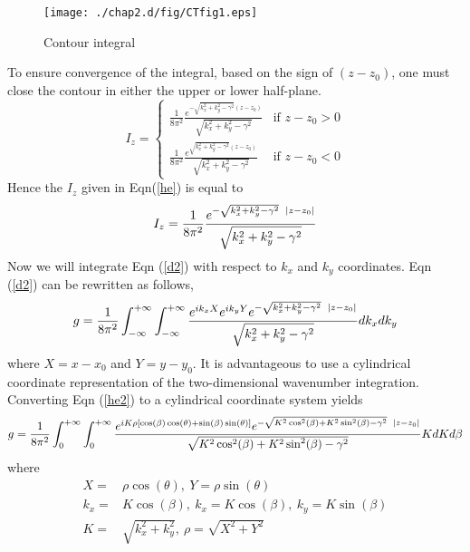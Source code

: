 \begin{figure}[h!]
\begin{center}
\texttt{[image: ./chap2.d/fig/CTfig1.eps]}
\caption{Contour integral}
\label{contour}
\end{center}
\end {figure}


To ensure convergence of the integral,  based on the  sign of $(z-z_0)$,
one must close the contour in either the upper or lower half-plane.
\begin{equation}
I_z = \begin{cases}
\frac{1}{8 \pi^2}\frac{e^{-\sqrt{k_x^2+k_y^2-\gamma^2}(z-z_0)}}{\sqrt {k_x^2+k_y^2-\gamma^2}}    &\mbox{if } z-z_0>0 \\ 
\frac{1}{8 \pi^2}\frac{e^{\sqrt{k_x^2+k_y^2-\gamma^2}(z-z_0)}}{\sqrt {k_x^2+k_y^2-\gamma^2}}    &\mbox{if } z-z_0 <0 
\end{cases}
\end{equation}
%
Hence the $I_z$ given in Eqn(\ref{he}) is equal to
\begin{equation}
I_z = 
\frac{1}{8 \pi^2}\frac{e^{-\sqrt{k_x^2+k_y^2-\gamma^2}\enskip |z-z_0|}}{\sqrt {k_x^2+k_y^2-\gamma^2}}
\end{equation}
%
Now we will integrate Eqn (\ref{d2}) with respect to $ k_x $ and $k_y$ coordinates.
Eqn (\ref{d2}) can be rewritten as follows,
%
\begin{equation}
\label{he2}
g=\frac{1}{8\pi^2}\int_{-\infty}^{+\infty}\int_{-\infty}^{+\infty}\frac{e^{ik_xX}e^{ik_yY} e^{-\sqrt{k_x^2+k_y^2-\gamma^2}\enskip|z-z_0|}}{\sqrt{k_x^2+k_y^2-\gamma^2} }dk_x dk_y   
\end{equation}
where $ X = x-x_0 $ and $ Y= y-y_0  $.
It is advantageous to use a cylindrical coordinate representation of the 
two-dimensional wavenumber integration. 
Converting Eqn (\ref{he2}) to a cylindrical coordinate system yields
\begin{equation}
  g=\frac{ 1}{8\pi^2}\int_{0}^{+\infty}\int_{0}^{+\infty}
  \frac{e^{iK \rho {[\cos(\beta)\cos(\theta)+\sin(\beta)\sin(\theta)}]}  
    e^{-\sqrt{K^2\cos^2(\beta)+K^2\sin^2(\beta) -\gamma^2}\enskip|z-z_0|}}{\sqrt{K^2\cos^2(\beta)+K^2\sin^2(\beta)-\gamma^2} }KdK d\beta 
\end{equation}
where 
\begin{equation}
\begin{split}
{X} = & \rho\cos(\theta),~ {Y} = \rho \sin(\theta) \\
k_x = &{K} \cos(\beta),~ k_x = {K} \cos(\beta),~ k_y = {K}\sin(\beta)\\
 K = &\sqrt{k_x^2+k_y^2},~ \rho = \sqrt{X^2+ Y^2}
\end{split}
\end{equation}
 
